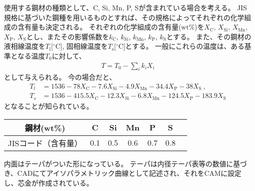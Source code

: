 


使用する鋼材の種類として、C, Si, Mn, P, Sが含まれている場合を考える。
JIS規格に基づいた鋼種を用いるものとすれば、その規格によってそれぞれの化学組成の含有量も決定される。
それぞれの化学組成の含有量($\mathrm{wt}\%$)を$X_\mathrm C$, $X_\mathrm{Si}$, $X_\mathrm{Mn}$, $X_\mathrm P$, $X_\mathrm S$とし、またその影響係数を$k_\mathrm C$, $k_\mathrm{Si}$, $k_\mathrm{Mn}$, $k_\mathrm P$, $k_\mathrm S$とする。
また、その鋼材の液相線温度を$T_\mathrm l$[$^\circ\mathrm C$], 固相線温度を$T_\mathrm s$[$^\circ\mathrm C$]とする。
一般にこれらの温度は、ある基準となる温度$T_0$に対して、
\begin{align*}
  T = T_0-\sum_i k_iX_i
\end{align*}
として与えられる。
今の場合だと、
\begin{align*}
  T_l
  &= 1536-78X_\mathrm C-7.6X_\mathrm{Si}-4.9X_\mathrm{Mn}-34.4X_\mathrm P-38X_\mathrm S~,\\
  T_s
  &= 1536-415.5X_\mathrm C-12.3X_\mathrm{Si}-6.8X_\mathrm{Mn}-124.5X_\mathrm P-183.9X_\mathrm S
\end{align*}
となることが知られている\cite{1986KO}。\\

\begin{tabular}[t]{|c|c|c|c|c|c|c|}
  \hline
  鋼材(wt\%) & C & Si & Mn & P & S
  \\\hline
  \index{JISコード（がんゆうりょう）}JISコード（含有量） & 0.1 & 0.5 & 0.6 & 0.7 & 0.8
  \\\hline
\end{tabular}


\clearpage
内面はテーパがついた形になっている。
テーパは内径テーパ表等の数値に基づき、CADにてアイソパラメトリック曲線として記述され、それをCAMに設定し、芯金が作成されている。

